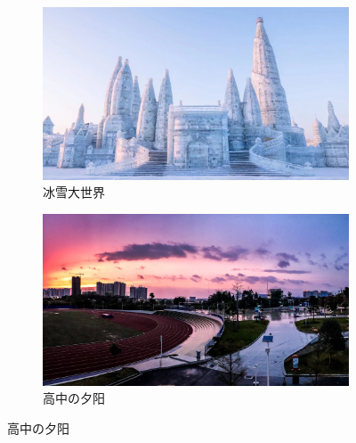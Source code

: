 \documentclass[zihao = -4, linespread = 1.5]{ctexart}
\begin{document}
\begin{figure}[htbp]
     \centering
     \begin{subfigure}[b]{.5\linewidth - 1mm}
         \centering
         \includegraphics[width=\textwidth]{picture/冰雪大世界.jpg} %
         \caption{冰雪大世界}
         \label{fig:冰雪大世界}
     \end{subfigure}
     \hfill
     \begin{subfigure}[b]{.5\linewidth - 1mm}
         \centering
         \includegraphics[width=\textwidth]{picture/高中の夕阳.jpg}
         \caption{高中の夕阳}
         \label{fig:高中夕阳}
     \end{subfigure}


\end{figure}
\end{document}
